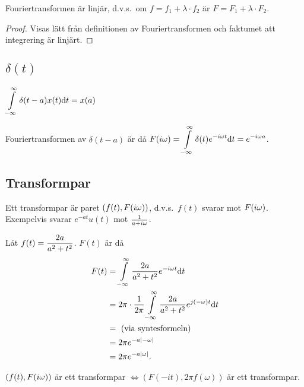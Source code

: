 \documentclass[a4paper]{article}
\begin{document}
\begin{sats}
    Fouriertransformen är linjär, d.v.s.\ om \(
        f = f_1 + \lambda \cdot f_2 
    \) är \(
        F = F_1 + \lambda \cdot F_2
    \).

    \begin{proof}
        Visas lätt från definitionen av Fouriertransformen och faktumet att 
        integrering är linjärt.
    \end{proof}
\end{sats}

\subsection{\(
    \delta(t)
\) }

\(
    \displaystyle\int\limits_{-\infty}^{\infty} \delta(t-a) x(t) \dd t = x(a)
\) 

Fouriertransformen av \(
    \delta(t-a
    )
\) är då \(
    F(i\omega) = \displaystyle\int\limits_{-\infty}^{\infty} \delta(t) e^{-i\omega t} \dd t
    = e^{-i\omega a}
\).

\subsection{Transformpar}
Ett transformpar är paret \(
    (f(t), F(i\omega))
\), d.v.s.\ \(
    f(t)
\) svarar mot \(
    F(i\omega)
\). Exempelvis svarar \(
    e^{-at}u(t)
\) mot \(
    \frac{1}{a+i\omega}
\).

\begin{ex}
    Låt \(
        f(t) = \displaystyle\frac{2a}{a^2+t^2} 
    \). \(
        F(t)
    \) är då 
    \begin{align*}
        F(t) &= \displaystyle\int\limits_{-\infty}^{\infty} \displaystyle\frac{2a}{a^2+t^2} e^{-i\omega t} \dd t \\
        &= 2\pi \cdot \frac{1}{2\pi} \displaystyle\int\limits_{-\infty}^{\infty} \displaystyle\frac{2a}{a^2+t^2} e^{j(-\omega)t} \dd t\\
        &= \text{ (via syntesformeln) } \\
        &= 2\pi e^{-a\abs{-\omega}} \\
        &= 2\pi e^{-a\abs{\omega}}.
    \end{align*}
\end{ex}


\begin{påst}
    \(
        (f(t), F(i\omega))
    \) är ett transformpar \(
        \iff (F(-it), 2\pi f(\omega))
    \) är ett transformpar.
\end{påst}
\end{document}
